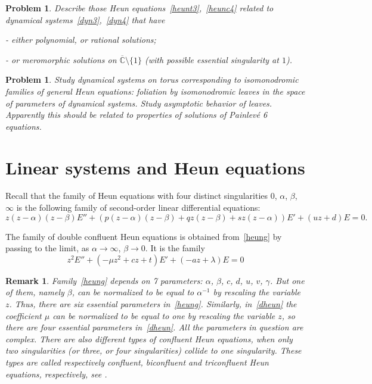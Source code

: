 \documentclass[preprint,12pt]{elsarticle}
\theoremstyle{plain}
\newtheorem{remark}[theorem]{Remark}
\newtheorem{problem}[theorem]{Problem}
\numberwithin{equation}{section}
\numberwithin{equation}{section}
\begin{document}
\begin{problem} Describe those Heun equations~\eqref{heunt3},~\eqref{heunc4} related to dynamical systems~\eqref{dyn3},~\eqref{dyn4} 
that have 

- either polynomial, or rational solutions;

- or  meromorphic solutions on $\overline{\mathbb{C}}\setminus\{1\}$ (with possible essential singularity at $1$). 
\end{problem}

\begin{problem} Study dynamical systems on torus corresponding to isomonodromic families of general  Heun equations: foliation by isomonodromic leaves in the space of parameters of dynamical systems. Study asymptotic behavior of leaves. Apparently this should be related to properties of solutions of Painlev\'e 6 equations.
\end{problem}


\section{Linear systems and Heun equations}\label{sec:lin-sys-Heun}

Recall that the family of Heun equations with four distinct singularities $0$, $\alpha$, $\beta$, $\infty$ is the following family of second-order linear differential equations:
\begin{equation} z(z-\alpha)(z-\beta)E''+(p(z-\alpha)(z-\beta)+qz(z-\beta)+sz(z-\alpha))E'+(uz+d)E=0.
\label{heung}\end{equation}

The family of double confluent Heun equations is obtained from~\eqref{heung} by passing to the limit, as $\alpha\to\infty$, $\beta\to0$. It is the family 
\begin{equation} z^2E''+(-\mu z^2+cz+t)E'+(-az+\lambda)E=0\label{dheun}\end{equation}
\begin{remark} Family~\eqref{heung} depends on 7 parameters: $\alpha$, $\beta$, $c$, $d$, $u$, $v$, $\gamma$. 
But one of them, namely $\beta$, can be normalized to be equal to $\alpha^{-1}$  by rescaling the variable $z$. Thus, there are six essential parameters in~\eqref{heung}. 
Similarly,  in~\eqref{dheun} the coefficient $\mu$ can be normalized to be equal to one by rescaling the variable $z$, so there are four essential parameters in~\eqref{dheun}. All the parameters in question are complex. 
There are also different types of confluent Heun equations, when only two singularities (or three, or four singularities) collide to one singularity. These types are called respectively confluent, biconfluent and triconfluent Heun equations, respectively, see  
\cite{ronveaux1995heun, slavyanov-lay2000}.\end{remark}
\end{document}
